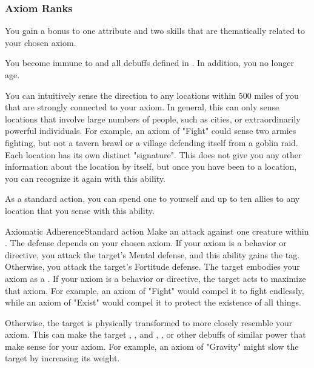   \subsubsection{Axiom Ranks}

     You gain a  bonus to one attribute and two skills that are thematically related to your chosen axiom.

     You become immune to  and all debuffs defined in .
    In addition, you no longer age.

     You can intuitively sense the direction to any locations within 500 miles of you that are strongly connected to your axiom.
    In general, this can only sense locations that involve large numbers of people, such as cities, or extraordinarily powerful individuals.
    For example, an axiom of "Fight" could sense two armies fighting, but not a tavern brawl or a village defending itself from a goblin raid.
    Each location has its own distinct "signature".
    This does not give you any other information about the location by itself, but once you have been to a location, you can recognize it again with this ability.

    As a standard action, you can spend one  to  yourself and up to ten allies to any location that you sense with this ability.

      \begin{magicalactiveability}{Axiomatic Adherence}{Standard action}
        \rankline
        Make an attack against one creature within \medrange.
        The defense depends on your chosen axiom.
        If your axiom is a behavior or directive, you attack the target's Mental defense, and this ability gains the \atCompulsion tag.
        Otherwise, you attack the target's Fortitude defense.
        \hit The target embodies your axiom as a .
        If your axiom is a behavior or directive, the target acts to maximize that axiom.
        For example, an axiom of "Fight" would compel it to fight endlessly, while an axiom of "Exist" would compel it to protect the existence of all things.

        Otherwise, the target is physically transformed to more closely resemble your axiom.
        This can make the target \blinded, \slowed, \dazed and \goaded, \panicked, or other debuffs of similar power that make sense for your axiom.
        For example, an axiom of "Gravity" might slow the target by increasing its weight.
      \end{magicalactiveability}

